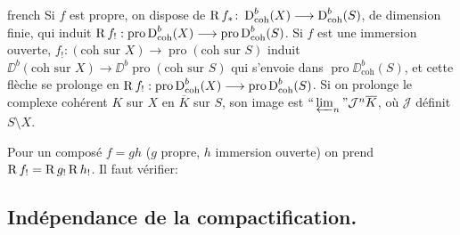 \begin{hyphenrules}{french}
Si $f$ est propre, on dispose de $\operatorname{R} f_{*}\colon \operatorname{D}_{\operatorname{coh}}^{b}(X) \longrightarrow \operatorname{D}_{\operatorname{coh}}^{b}(S)$, de dimension finie, qui induit $\operatorname{R} f_{!}: \operatorname{pro}\operatorname{D}_{\operatorname{coh}}^{b}(X) \longrightarrow \operatorname{pro}\operatorname{D}_{\operatorname{coh}}^{b}(S)$. Si $f$ est une immersion ouverte, $f_{!}: (\text{coh sur } X) \longrightarrow \operatorname{pro}(\text{coh sur } S)$ induit $\DD^{b}(\text{coh sur } X) \longrightarrow \DD^{b}\operatorname{pro}(\text{coh sur } S)$ qui s'envoie dans $\operatorname{pro}\DD_{\operatorname{coh}}^{b}(S)$, et cette fl\`eche se prolonge en $\operatorname{R} f_{!}: \operatorname{pro}\operatorname{D}_{\operatorname{coh}}^{b}(X) \longrightarrow \operatorname{pro}\operatorname{D}_{\operatorname{coh}}^{b}(S)$. Si on prolonge le complexe coh\'erent $K$ sur $X$ en $\overline{K}$ sur $S$, son image est $\text{``}\varprojlim_n\text{''}\mathcal J^n\overline K$, o\`u $\mathcal{J}$ d\'efinit $S \setminus X$.

Pour un compos\'e $f = gh$ ($g$ propre, $h$ immersion ouverte) on prend $\operatorname{R} f_{!} = \operatorname{R} g_{!}\operatorname{R} h_{!}$. Il faut v\'erifier:

\subsection*{Ind\'ependance de la compactification.}


\end{hyphenrules}

